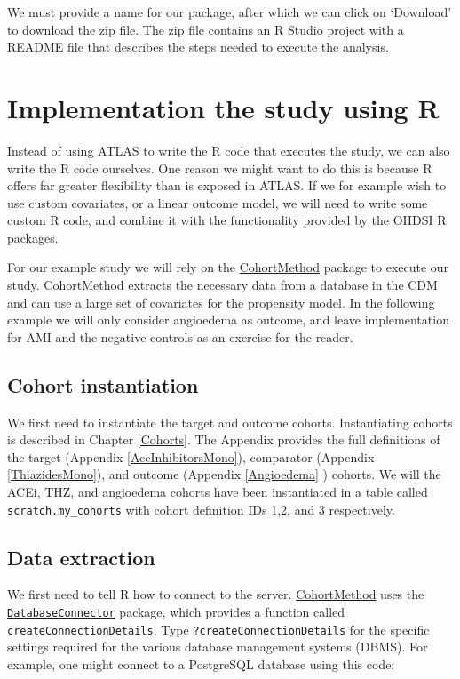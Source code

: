 \documentclass[11pt]{book}
\begin{document}
We must provide a name for our package, after which we can click on
`Download' to download the zip file. The zip file contains an R Studio
project with a README file that describes the steps needed to execute
the analysis.

\section{Implementation the study using
R}\label{implementation-the-study-using-r}

Instead of using ATLAS to write the R code that executes the study, we
can also write the R code ourselves. One reason we might want to do this
is because R offers far greater flexibility than is exposed in ATLAS. If
we for example wish to use custom covariates, or a linear outcome model,
we will need to write some custom R code, and combine it with the
functionality provided by the OHDSI R packages.

For our example study we will rely on the
\href{https://ohdsi.github.io/CohortMethod/}{CohortMethod} package to
execute our study. CohortMethod extracts the necessary data from a
database in the CDM and can use a large set of covariates for the
propensity model. In the following example we will only consider
angioedema as outcome, and leave implementation for AMI and the negative
controls as an exercise for the reader.

\subsection{Cohort instantiation}\label{cohort-instantiation}

We first need to instantiate the target and outcome cohorts.
Instantiating cohorts is described in Chapter \ref{Cohorts}. The
Appendix provides the full definitions of the target (Appendix
\ref{AceInhibitorsMono}), comparator (Appendix \ref{ThiazidesMono}), and
outcome (Appendix \ref{Angioedema} ) cohorts. We will the ACEi, THZ, and
angioedema cohorts have been instantiated in a table called
\texttt{scratch.my\_cohorts} with cohort definition IDs 1,2, and 3
respectively.

\subsection{Data extraction}\label{data-extraction}

We first need to tell R how to connect to the server.
\href{https://ohdsi.github.io/CohortMethod/}{CohortMethod} uses the
\href{https://ohdsi.github.io/DatabaseConnector/}{\texttt{DatabaseConnector}}
package, which provides a function called
\texttt{createConnectionDetails}. Type \texttt{?createConnectionDetails}
for the specific settings required for the various database management
systems (DBMS). For example, one might connect to a PostgreSQL database
using this code:
\end{document}
